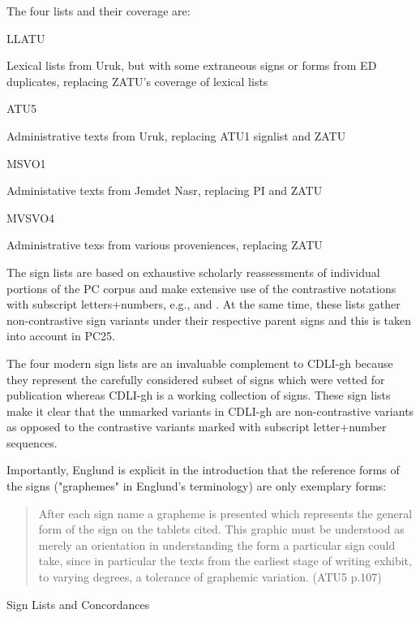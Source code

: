 \par The four lists and their coverage are:

\Hdl\Hdt{}LLATU

{}Lexical lists from Uruk, but with some extraneous signs or
	forms from ED duplicates, replacing ZATU's coverage of lexical
	lists

\Hdt{}ATU5

{}Administrative texts from Uruk, replacing ATU1 signlist and ZATU

\Hdt{}MSVO1

{}Administative texts from Jemdet Nasr, replacing PI and ZATU

\Hdt{}MVSVO4

{}Administrative texs from various proveniences, replacing ZATU

\Henddl

\par The sign lists are based on exhaustive scholarly
      reassessments of individual portions of the PC corpus and make
      extensive use of the contrastive notations with subscript
      letters+numbers, e.g.,  and
      .  At the same time, these lists
      gather non-contrastive sign variants under their respective
      parent signs and this is taken into account in PC25.


\par The four modern sign lists are an invaluable complement to
      CDLI-gh because they represent the carefully considered subset
      of signs which were vetted for publication whereas CDLI-gh is a
      working collection of signs.  These sign lists make it clear
      that the unmarked variants in CDLI-gh are non-contrastive
      variants as opposed to the contrastive variants marked with
      subscript letter+number sequences.


\par Importantly, Englund is explicit in the introduction that the
      reference forms of the signs ("graphemes" in Englund's
      terminology) are only exemplary forms:

\begin{quote}After each sign name a grapheme is presented which
      represents the general form of the sign on the tablets
      cited. This graphic must be understood as merely an orientation
      in understanding the form a particular sign could take, since in
      particular the texts from the earliest stage of writing exhibit,
      to varying degrees, a tolerance of graphemic variation.  (ATU5
      p.107)
\end{quote}
\Hhhh{}Sign Lists and Concordances


